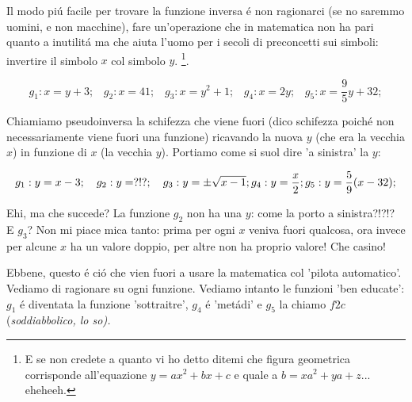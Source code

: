 Il modo pi\'u facile per trovare la funzione inversa \'e non ragionarci (se no saremmo uomini, e non macchine), fare un'operazione che in matematica non
ha pari quanto a inutilit\'a ma che aiuta l'uomo per i secoli di preconcetti sui simboli: invertire il simbolo $x$ col simbolo $y$. \footnote{E se non
credete a quanto vi ho detto ditemi che figura geometrica corrisponde all'equazione $y=ax^2+bx+c$ e quale a $b=xa^2+ya+z$... eheheeh.}. 

\begin{equation}
g_1: x=y+3; \hspace{10pt} 
g_2: x=41; \hspace{10pt} 
g_3: x=y^2+1; \hspace{10pt} 
g_4: x=2y; \hspace{10pt} 
g_5: x=\frac{9}{5}y+32; 
\end{equation}


Chiamiamo pseudoinversa la schifezza che viene fuori (dico schifezza poich\'e non necessariamente viene fuori una funzione) ricavando la nuova $y$
(che era la vecchia $x$) in funzione di $x$ (la vecchia $y$). Portiamo come si suol dire 'a sinistra' la $y$:

\begin{equation}
g_1: y=x-3; \hspace{10pt} 
g_2: y=?!?; \hspace{10pt} 
g_3: y=\pm \sqrt{x-1}; \\
g_4: y=\frac{x}{2}; 
g_5: y=\frac{5}{9}(x-32); 
\end{equation}

Ehi, ma che succede? La funzione $g_2$ non ha una $y$: come la porto a sinistra?!?!? E $g_3$? Non mi piace mica tanto: prima per ogni $x$ veniva
fuori qualcosa, ora invece per alcune $x$ ha un valore doppio, per altre non ha proprio valore! Che casino!

Ebbene, questo \'e ci\'o che vien fuori a usare la matematica col 'pilota automatico'. Vediamo di ragionare su ogni funzione. Vediamo intanto
le funzioni 'ben educate': $g_1$ \'e diventata la funzione 'sottraitre', $g_4$ \'e 'met\'adi' e $g_5$ la chiamo $f2c$ (\em{soddiabbolico}, lo so).

